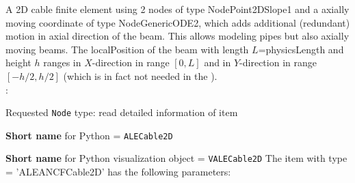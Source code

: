 \ei

%
\newpage


\label{sec:item:ObjectALEANCFCable2D}
A 2D cable finite element using 2 nodes of type NodePoint2DSlope1 and a axially moving coordinate of type NodeGenericODE2, which adds additional (redundant) motion in axial direction of the beam. This allows modeling pipes but also axially moving beams. The localPosition of the beam with length $L$=physicsLength and height $h$ ranges in $X$-direction in range $[0, L]$ and in $Y$-direction in range $[-h/2,h/2]$ (which is in fact not needed in the ).
\vspace{12pt}\\

\noindent {}:
\bi
  \item Requested \texttt{Node} type: read detailed information of item
  \item {\bf Short name} for Python = \texttt{ALECable2D}
  \item {\bf Short name} for Python visualization object = \texttt{VALECable2D}
\ei\vspace{12pt} \noindent 
The item  with type = 'ALEANCFCable2D' has the following parameters:
\vspace{-0.5cm}\\
\vspace{-0.5cm}\\
